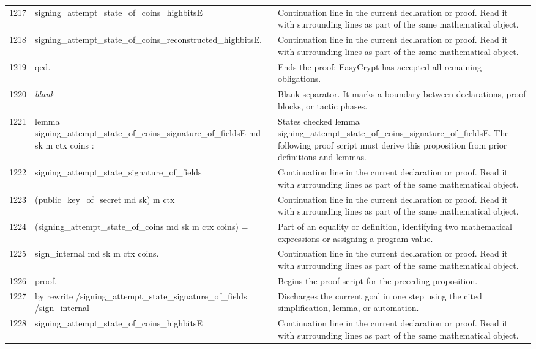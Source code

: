 \documentclass[10pt]{article}
\begin{document}
\begin{longtable}{r L{0.53\textwidth} L{0.37\textwidth}}
1217 & {\ttfamily\scriptsize            signing\_attempt\_state\_of\_coins\_highbitsE} & Continuation line in the current declaration or proof.  Read it with surrounding lines as part of the same mathematical object. \\
1218 & {\ttfamily\scriptsize            signing\_attempt\_state\_of\_coins\_reconstructed\_highbitsE.} & Continuation line in the current declaration or proof.  Read it with surrounding lines as part of the same mathematical object. \\
1219 & {\ttfamily\scriptsize qed.} & Ends the proof; EasyCrypt has accepted all remaining obligations. \\
1220 & {\ttfamily\scriptsize \emph{blank}} & Blank separator.  It marks a boundary between declarations, proof blocks, or tactic phases. \\
1221 & {\ttfamily\scriptsize lemma signing\_attempt\_state\_of\_coins\_signature\_of\_fieldsE md sk m ctx coins :} & States checked lemma signing\_attempt\_state\_of\_coins\_signature\_of\_fieldsE.  The following proof script must derive this proposition from prior definitions and lemmas. \\
1222 & {\ttfamily\scriptsize   signing\_attempt\_state\_signature\_of\_fields} & Continuation line in the current declaration or proof.  Read it with surrounding lines as part of the same mathematical object. \\
1223 & {\ttfamily\scriptsize     (public\_key\_of\_secret md sk) m ctx} & Continuation line in the current declaration or proof.  Read it with surrounding lines as part of the same mathematical object. \\
1224 & {\ttfamily\scriptsize     (signing\_attempt\_state\_of\_coins md sk m ctx coins) =} & Part of an equality or definition, identifying two mathematical expressions or assigning a program value. \\
1225 & {\ttfamily\scriptsize   sign\_internal md sk m ctx coins.} & Continuation line in the current declaration or proof.  Read it with surrounding lines as part of the same mathematical object. \\
1226 & {\ttfamily\scriptsize proof.} & Begins the proof script for the preceding proposition. \\
1227 & {\ttfamily\scriptsize by rewrite /signing\_attempt\_state\_signature\_of\_fields /sign\_internal} & Discharges the current goal in one step using the cited simplification, lemma, or automation. \\
1228 & {\ttfamily\scriptsize            signing\_attempt\_state\_of\_coins\_highbitsE} & Continuation line in the current declaration or proof.  Read it with surrounding lines as part of the same mathematical object. \\

\end{longtable}
\end{document}
